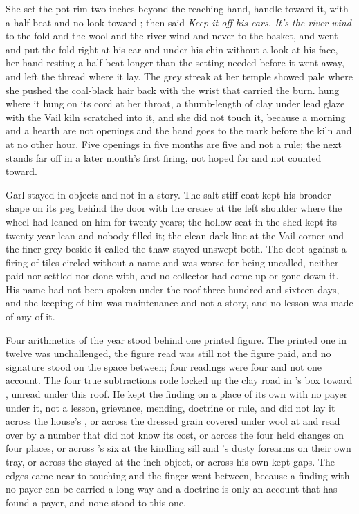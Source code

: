 She set the pot rim two inches beyond the reaching hand, handle toward it, with a half-beat and no look toward ; then said \emph{Keep it off his ears. It's the river wind} to the fold and the wool and the river wind and never to the basket, and went and put the fold right at his ear and under his chin without a look at his face, her hand resting a half-beat longer than the setting needed before it went away, and left the thread where it lay. The grey streak at her temple showed pale where she pushed the coal-black hair back with the wrist that carried the burn.  hung where it hung on its cord at her throat, a thumb-length of clay under lead glaze with the Vail kiln scratched into it, and she did not touch it, because a morning and a hearth are not openings and the hand goes to the mark before the kiln and at no other hour. Five openings in five months are five and not a rule; the next stands far off in a later month's first firing, not hoped for and not counted toward.

Garl stayed in objects and not in a story. The salt-stiff coat kept his broader shape on its peg behind the door with the crease at the left shoulder where the wheel had leaned on him for twenty years; the hollow seat in the shed kept its twenty-year lean and nobody filled it; the clean dark line at the Vail corner and the finer grey beside it called the thaw stayed unswept both. The debt against a firing of tiles circled without a name and was worse for being uncalled, neither paid nor settled nor done with, and no collector had come up  or gone down it. His name had not been spoken under the roof three hundred and sixteen days, and the keeping of him was maintenance and not a story, and no lesson was made of any of it.

\scenebreak

Four arithmetics of the year stood behind one printed figure. The printed one in twelve was unchallenged, the figure read was still not the figure paid, and no signature stood on the space between; four readings were four and not one account. The four true subtractions rode locked up the clay road in 's box toward , unread under this roof. He kept the finding on a place of its own with no payer under it, not a lesson, grievance, mending, doctrine or rule, and did not lay it across the house's , or across the dressed grain covered under wool at  and read over by a number that did not know its cost, or across the four held changes on four places, or across 's six at the kindling sill and 's dusty forearms on their own tray, or across the stayed-at-the-inch object, or across his own kept gaps. The edges came near to touching and the finger went between, because a finding with no payer can be carried a long way and a doctrine is only an account that has found a payer, and none stood to this one.

